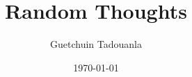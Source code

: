 \usepackage[margin=1in, top=1.2in, bottom=1.2in]{geometry}

\usepackage{eurosym}
\usepackage[T1]{fontenc}
\usepackage{lmodern}
\usepackage{microtype}

\usepackage[english]{babel}
\usepackage{amsmath, amssymb, amsthm}
\usepackage{csquotes}

\usepackage{booktabs}
\usepackage{graphicx}
\usepackage{xcolor}


\usepackage[backend=biber, style=numeric-comp, sorting=nyt, giveninits=true]{biblatex}


\usepackage[
  pdfencoding=auto,
  colorlinks=true,
  linkcolor=navyblue,
  citecolor=navyblue,
  urlcolor=navyblue
]{hyperref}

\title{Random Thoughts}
\author{Guetchuin Tadouanla}
\date{\today}
